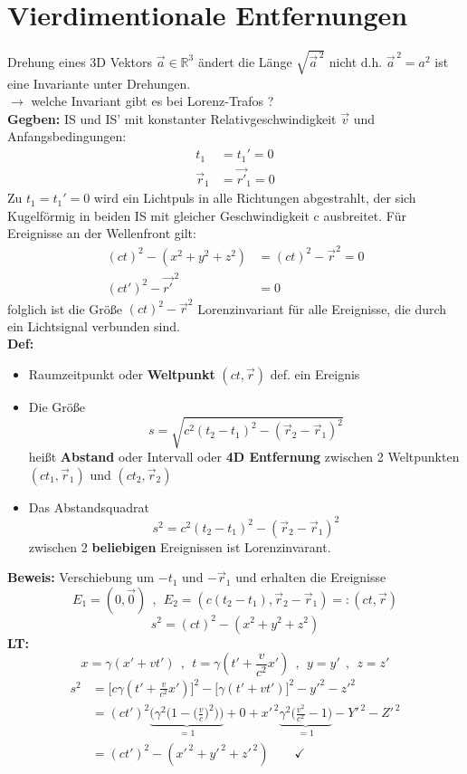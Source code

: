 \documentclass[titlepage,12pt,a4paper,ngerman]{report}
\newcommand{\ub}[1]{\underbrace{#1}}
\begin{document}
\section{Vierdimentionale Entfernungen}
Drehung eines 3D Vektors $ \vec{a} \in \mathbb{R}^3 $ ändert die Länge $ \sqrt{\vec{a}^{\,2}} $ nicht d.h. $ \vec{a}^{\, 2} = a^2 $ ist eine Invariante unter Drehungen.\\
$ \rightarrow $ welche Invariant gibt es bei Lorenz-Trafos ?\\[5pt]
\textbf{Gegben:} IS und IS' mit konstanter Relativgeschwindigkeit $ \vec{v} $ und Anfangsbedingungen:
\begin{align*}
t_1 &= t_1' = 0\\
\vec{r}_1 &= \vec{r'}_1 = 0
\end{align*}
Zu $ t_1 = t_1' = 0 $ wird ein Lichtpuls in alle Richtungen abgestrahlt, der sich Kugelförmig in beiden IS mit gleicher Geschwindigkeit c ausbreitet. Für Ereignisse an der Wellenfront gilt:
\begin{align*}
(ct)^2 - (x^2 + y^2 + z^2) &= (ct)^2 - \vec{r}^2 = 0\\
(ct')^2 - \vec{r'}^{\, 2} &= 0
\end{align*}
folglich ist die Größe $ (ct)^2 - \vec{r}^2 $ Lorenzinvariant für alle Ereignisse, die durch ein Lichtsignal verbunden sind.\\
\textbf{Def:}
\begin{itemize}
	\item Raumzeitpunkt oder \textbf{Weltpunkt} $ (ct,\vec{r}) $ def. ein Ereignis
	\item Die Größe
	$$s = \sqrt{c^2(t_2-t_1)^2 - (\vec{r}_2 - \vec{r}_1)^2}$$
	heißt \textbf{Abstand} oder Intervall oder \textbf{4D Entfernung} zwischen 2 Weltpunkten $ (ct_1,\vec{r}_1) $ und $ (ct_2,\vec{r}_2) $
	\item Das Abstandsquadrat
	$$s^2 = c^2 (t_2-t_1)^2- (\vec{r}_2 - \vec{r}_1)^2$$
	zwischen 2 \textbf{beliebigen} Ereignissen ist Lorenzinvarant.
\end{itemize}
\textbf{Beweis:} Verschiebung um $ -t_1 $ und $ - \vec{r}_1 $ und erhalten die Ereignisse
$$E_1 = (0,\vec{0})\ \ , \ \ E_2 = (c(t_2-t_1) , \vec{r}_2 - \vec{r}_1) =: (ct,\vec{r})$$
$$s^2 = (ct)^2 - (x^2 + y^2 + z^2)$$
\textbf{LT:}
$$x = \gamma (x' + vt') \ \ , \ \ t = \gamma(t' + \frac{v}{c^2} x') \ \ , \ \ y = y' \ \ , \ \ z = z'$$
\begin{align*}
s^2 &= \bigg[c \gamma (t' + \frac{v}{c^2} x')\bigg]^2 - \bigg[\gamma (t' + vt')\bigg]^2 - y'^2 - z'^2\\
&= (ct')^2 \ub{\bigg(\gamma^2 \bigg(1 - \bigg(\frac{v}{c}\bigg)^2\bigg) \bigg)}_{= 1} + 0 + x'^{\, 2} \ub{\gamma^2 \bigg(\frac{v^2}{c^2} - 1\bigg)}_{= 1} - Y'^{\, 2} - Z'^{\, 2}\\
&= (ct')^2 - (x'^{\, 2} + y'^{\, 2} + z'^{\, 2}) \qquad \checkmark
\end{align*}
\end{document}
